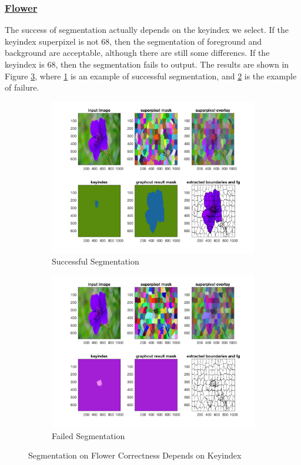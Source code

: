 \subsubsection{\href{./hw5/flower1.jpg}{Flower}}
The success of segmentation actually depends on the keyindex we select.
If the keyindex superpixel is not 68, then the segmentation of foreground and background are acceptable, although there are still some differencs.
If the keyindex is 68, then the segmentation fails to output.
The results are shown in Figure \ref{fig:21}, where \ref{fig:21a} is an example of successful segmentation, and \ref{fig:21b} is the example of failure.
\begin{figure}[htbp]
	\centering
	\begin{subfigure}[t]{0.8\textwidth}
	    \centering
        \includegraphics[width=\textwidth]{hw5/segCorrect.png}
		\caption{Successful Segmentation}\label{fig:21a}
	\end{subfigure}
	\begin{subfigure}[t]{0.8\textwidth}
	    \centering
		\includegraphics[width=\textwidth]{hw5/segFail.png}
		\caption{Failed Segmentation}\label{fig:21b}
	\end{subfigure}
	\caption{Segmentation on Flower Correctness Depends on Keyindex}\label{fig:21}
\end{figure}



